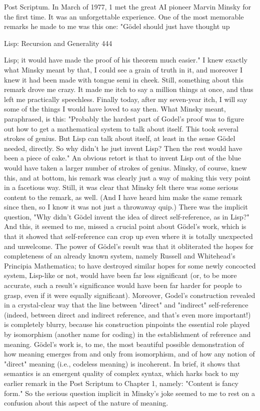 Post Scriptum.
       In March of 1977, 1 met the great AI pioneer Marvin Minsky for the first time.
It was an unforgettable experience. One of the most memorable remarks he made to
me was this one: "Gödel should just have thought up




Lisp: Recursion and Generality                                                        444

Lisp; it would have made the proof of his theorem much easier." I knew exactly what
Minsky meant by that, I could see a grain of truth in it, and moreover I knew it had
been made with tongue semi in cheek. Still, something about this remark drove me
crazy. It made me itch to say a million things at once, and thus left me practically
speechless. Finally today, after my seven-year itch, I will say some of the things I
would have loved to say then.
        What Minsky meant, paraphrased, is this: "Probably the hardest part of
Godel's proof was to figure out how to get a mathematical system to talk about itself.
This took several strokes of genius. But Lisp can talk about itself, at least in the sense
Gödel needed, directly. So why didn't he just invent Lisp? Then the rest would have
been a piece of cake." An obvious retort is that to invent Lisp out of the blue would
have taken a larger number of strokes of genius. Minsky, of course, knew this, and at
bottom, his remark was clearly just a way of making this very point in a facetious
way.
        Still, it was clear that Minsky felt there was some serious content to the
remark, as well. (And I have heard him make the same remark since then, so I know it
was not just a throwaway quip.) There was the implicit question, "Why didn't Gödel
invent the idea of direct self-reference, as in Lisp?" And this, it seemed to me, missed
a crucial point about Gödel’s work, which is that it showed that self-reference can
crop up even where it is totally unexpected and unwelcome. The power of Gödel’s
result was that it obliterated the hopes for completeness of an already known system,
namely Russell and Whitehead's Principia Mathematica; to have destroyed similar
hopes for some newly concocted system, Lisp-like or not, would have been far less
significant (or, to be more accurate, such a result's significance would have been far
harder for people to grasp, even if it were equally significant).
        Moreover, Godel's construction revealed in a crystal-clear way that the line
between "direct" and "indirect" self-reference (indeed, between direct and indirect
reference, and that's even more important!) is completely blurry, because his
construction pinpoints the essential role played by isomorphism (another name for
coding) in the establishment of reference and meaning. Gödel’s work is, to me, the
most beautiful possible demonstration of how meaning emerges from and only from
isomorphism, and of how any notion of "direct" meaning (i.e., codeless meaning) is
incoherent. In brief, it shows that semantics is an emergent quality of complex
syntax, which harks back to my earlier remark in the Post Scriptum to Chapter 1,
namely: "Content is fancy form." So the serious question implicit in Minsky's joke
seemed to me to rest on a confusion about this aspect of the nature of meaning.

